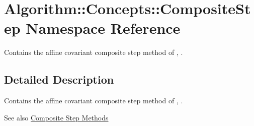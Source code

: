 \hypertarget{namespaceAlgorithm_1_1Concepts_1_1CompositeStep}{}\section{Algorithm\+:\+:Concepts\+:\+:Composite\+Step Namespace Reference}
\label{namespaceAlgorithm_1_1Concepts_1_1CompositeStep}


Contains the affine covariant composite step method of \cite{Lubkoll2015}, \cite{Lubkoll2015a}.  




\subsection{Detailed Description}
Contains the affine covariant composite step method of \cite{Lubkoll2015}, \cite{Lubkoll2015a}. 

\begin{DoxySeeAlso}{See also}
\hyperlink{group__CSGroup}{Composite Step Methods} 
\end{DoxySeeAlso}
